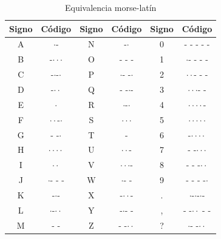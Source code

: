 \documentclass[a4paper,10pt]{article}
\theoremstyle{mytheor}
\begin{document}
\begin{table}[H]
    \begin{center}
        \caption{Equivalencia morse-lat\'in}\label{tab:t1}
        \begin{tabular}{|c|c|c|c|c|c|} \hline
			\textbf{Signo} & \textbf{C\'odigo} & \textbf{Signo} & \textbf{C\'odigo} & \textbf{Signo} & \textbf{C\'odigo} \\ \hline
			A & $\cdot$-    & N & -$\cdot$ & 0 & - - - - -   \\ \hline
			B & -$\cdot\cdot\cdot$ & O & - - -   & 1 & $\cdot$- - - -   \\ \hline
			C & -$\cdot$-$\cdot$ & P & $\cdot$- -$\cdot$ & 2 & $\cdot\cdot$- - -   \\ \hline
			D & -$\cdot\cdot$   & Q & - -$\cdot$- & 3 & $\cdot\cdot\cdot$- -   \\ \hline
			E & $\cdot$ 	    & R & $\cdot$-$\cdot$   & 4 &	$\cdot\cdot\cdot\cdot$-   \\ \hline
			F & $\cdot\cdot$-$\cdot$ & S & $\cdot\cdot\cdot$   & 5 & $\cdot\cdot\cdot\cdot\cdot$   \\ \hline
			G & - -$\cdot$   & T & - 	  & 6 & -$\cdot\cdot\cdot\cdot$   \\ \hline
			H & $\cdot\cdot\cdot\cdot$ & U & $\cdot\cdot$-   & 7 & - -$\cdot\cdot\cdot$   \\ \hline
			I & $\cdot\cdot$     & V & $\cdot\cdot\cdot$- & 8 &	- - -$\cdot\cdot$   \\ \hline
			J & $\cdot$- - - & W & $\cdot$- -   & 9 &	- - - -$\cdot$   \\ \hline
			K & -$\cdot$-   & X & -$\cdot\cdot$- & . &	$\cdot$-$\cdot$-$\cdot$- \\ \hline
			L & $\cdot$-$\cdot\cdot$ & Y & -$\cdot$- - & , &	- -$\cdot\cdot$ - - \\ \hline
			M & - -     & Z & - -$\cdot\cdot$ & ? & $\cdot$- -$\cdot\cdot$   \\ \hline
		\end{tabular}
    \end{center}
\end{table}
\end{document}
